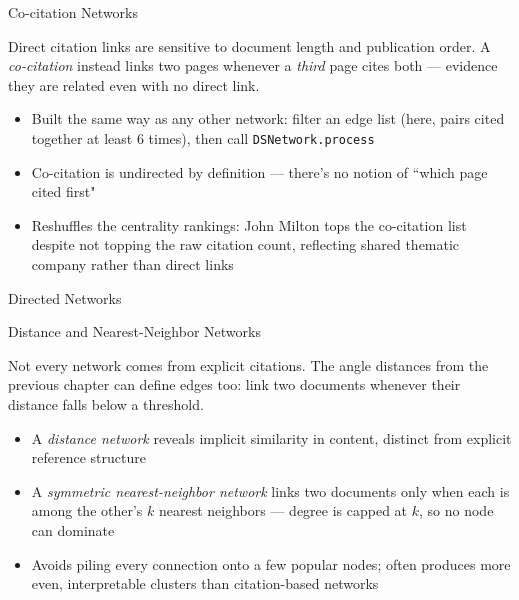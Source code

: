 \documentclass[8pt,aspectratio=169]{beamer}
\begin{document}
\begin{textframe}{Co-citation Networks}

Direct citation links are sensitive to document length and publication order. A \textit{co-citation} instead links two pages whenever a \textit{third} page cites both --- evidence they are related even with no direct link.

\begin{itemize}
\item Built the same way as any other network: filter an edge list (here, pairs cited together at least 6 times), then call \texttt{DSNetwork.process}
\item Co-citation is undirected by definition --- there's no notion of ``which page cited first"
\item Reshuffles the centrality rankings: John Milton tops the co-citation list despite not topping the raw citation count, reflecting shared thematic company rather than direct links
\end{itemize}

\end{textframe}

\begin{rightframe}{Directed Networks}
\end{rightframe}

\begin{textframe}{Distance and Nearest-Neighbor Networks}

Not every network comes from explicit citations. The angle distances from the previous chapter can define edges too: link two documents whenever their distance falls below a threshold.

\begin{itemize}
\item A \textit{distance network} reveals implicit similarity in content, distinct from explicit reference structure
\item A \textit{symmetric nearest-neighbor network} links two documents only when each is among the other's $k$ nearest neighbors --- degree is capped at $k$, so no node can dominate
\item Avoids piling every connection onto a few popular nodes; often produces more even, interpretable clusters than citation-based networks
\end{itemize}

\end{textframe}
\end{document}
